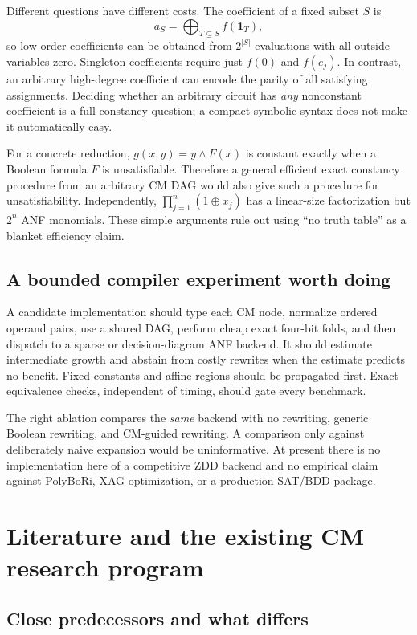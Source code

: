 \documentclass[11pt,a4paper]{article}
\theoremstyle{definition}\newtheorem{definition}[theorem]{Definition}
\theoremstyle{remark}\newtheorem{remark}[theorem]{Remark}
\numberwithin{equation}{section}
\begin{document}
Different questions have different costs. The coefficient of a fixed subset $S$ is
\begin{equation}\label{eq:coeffquery}
 a_S=\bigoplus_{T\subseteq S}f(\mathbf1_T),
\end{equation}
so low-order coefficients can be obtained from $2^{|S|}$ evaluations with all outside variables zero. Singleton coefficients require just $f(0)$ and $f(e_j)$. In contrast, an arbitrary high-degree coefficient can encode the parity of all satisfying assignments. Deciding whether an arbitrary circuit has \emph{any} nonconstant coefficient is a full constancy question; a compact symbolic syntax does not make it automatically easy.

For a concrete reduction, $g(x,y)=y\land F(x)$ is constant exactly when a Boolean formula $F$ is unsatisfiable. Therefore a general efficient exact constancy procedure from an arbitrary CM DAG would also give such a procedure for unsatisfiability. Independently, $\prod_{j=1}^n(1\oplus x_j)$ has a linear-size factorization but $2^n$ ANF monomials. These simple arguments rule out using ``no truth table'' as a blanket efficiency claim.

\subsection{A bounded compiler experiment worth doing}
A candidate implementation should type each CM node, normalize ordered operand pairs, use a shared DAG, perform cheap exact four-bit folds, and then dispatch to a sparse or decision-diagram ANF backend. It should estimate intermediate growth and abstain from costly rewrites when the estimate predicts no benefit. Fixed constants and affine regions should be propagated first. Exact equivalence checks, independent of timing, should gate every benchmark.

The right ablation compares the \emph{same} backend with no rewriting, generic Boolean rewriting, and CM-guided rewriting. A comparison only against deliberately naive expansion would be uninformative. At present there is no implementation here of a competitive ZDD backend and no empirical claim against PolyBoRi, XAG optimization, or a production SAT/BDD package.

\section{Literature and the existing CM research program}\label{sec:related}
\subsection{Close predecessors and what differs}
\end{document}
